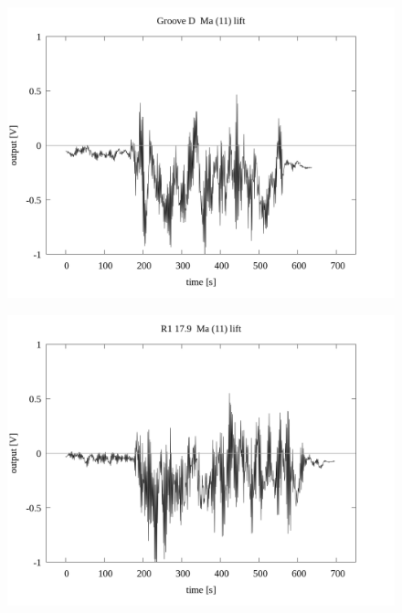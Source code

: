 \documentclass[a4paper]{jsarticle}
\begin{document}
\begin{figure}[htbp]
    \footnotesize
    \begin{center}
        \includegraphics[width=140mm]{../../../33_result/210806/moving_average/11/lift/01/Groove_D_ma(11)_lift_01.png}
    \end{center}
\end{figure}

\begin{figure}[htbp]
    \footnotesize
    \begin{center}
        \includegraphics[width=140mm]{../../../33_result/210806/moving_average/11/lift/01/R1_17.9_ma(11)_lift_01.png}
    \end{center}
\end{figure}
\end{document}

